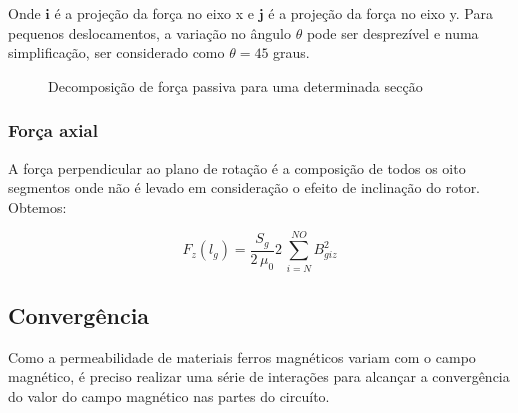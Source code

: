 Onde $\boldsymbol{i}$ é a projeção da força no eixo x e $\boldsymbol{j}$ é a projeção da força no eixo y. Para pequenos deslocamentos, a variação no ângulo $\theta$ pode ser desprezível e numa simplificação, ser considerado como $\theta = 45$ graus.

 	\begin{figure}[!ht]
 		\centering
			
 			\caption{Decomposição de força passiva para uma determinada secção}
 			\label{fig:Passivo:decomposicao}
 	\end{figure}



%
%

\subsubsection{Força axial}

A força perpendicular ao plano de rotação é a composição de todos os oito segmentos onde não é levado em consideração o efeito de inclinação do rotor. Obtemos:

\begin{equation}
	  		F_z(l_g) = \frac{S_{g}}{2 \, \mu_0} 	2 \,\sum_{i=N}^{NO} B_{giz}^2
\end{equation}


\subsection{Convergência}

Como a permeabilidade de materiais ferros magnéticos variam com o campo magnético, é preciso realizar uma série de interações para alcançar a convergência do valor do campo magnético nas partes do circuíto. 

